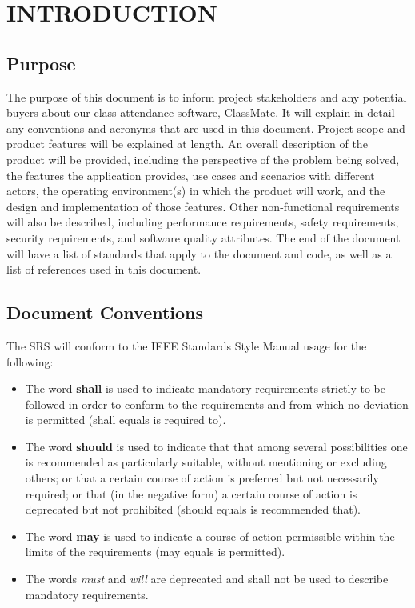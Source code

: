 \documentclass[letterpaper,12pt,oneside,listof=totoc]{scrreprt}
\begin{document}
\chapter{INTRODUCTION}

\section{Purpose}
The purpose of this document is to inform project stakeholders and any potential buyers about our class attendance software, ClassMate. It will explain in detail any conventions and acronyms that are used in this document. Project scope and product features will be explained at length. An overall description of the product will be provided, including the perspective of the problem being solved, the features the application provides, use cases and scenarios with different actors, the operating environment(s) in which the product will work, and the design and implementation of those features. Other non-functional requirements will also be described, including performance requirements, safety requirements, security requirements, and software quality attributes. The end of the document will have a list of standards that apply to the document and code, as well as a list of references used in this document.

\section{Document Conventions}
The SRS will conform to the IEEE Standards Style Manual usage for the following:
\begin{itemize}
\item The word \textbf{shall} is used to indicate mandatory requirements strictly to be followed in order to conform to the requirements and from which no deviation is permitted (shall equals is required to).
\item The word \textbf{should} is used to indicate that that among several possibilities one is recommended as particularly suitable, without mentioning or excluding others; or that a certain course of action is preferred but not necessarily required; or that (in the negative form) a certain course of action is deprecated but not prohibited (should equals is recommended that).
\item The word \textbf{may} is used to indicate a course of action permissible within the limits of the requirements (may equals is permitted).
\item The words \textit{must} and \textit{will} are deprecated and shall not be used to describe mandatory requirements.
\end{itemize}
\end{document}
